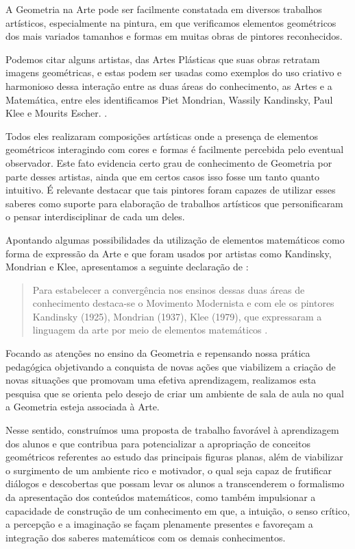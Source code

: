 \begin{refsection}
    A Geometria na Arte pode ser facilmente constatada em diversos trabalhos artísticos, especialmente na pintura, em que verificamos elementos geométricos dos mais variados tamanhos e formas em muitas obras de pintores reconhecidos.  

    Podemos citar alguns artistas, das Artes Plásticas que suas obras retratam imagens geométricas, e estas podem ser usadas como exemplos do uso criativo e harmonioso dessa interação entre as duas áreas do conhecimento, as Artes e a Matemática, entre eles identificamos Piet Mondrian, Wassily Kandinsky, Paul Klee e Mourits Escher. \cite{WIKIARTEnciclopédia}.

    Todos eles realizaram composições artísticas onde a presença de elementos geométricos interagindo com cores e formas é facilmente percebida pelo eventual observador. Este fato evidencia certo grau de conhecimento de Geometria por parte desses artistas, ainda que em certos casos isso fosse um tanto quanto intuitivo. É relevante destacar que tais pintores foram capazes de utilizar esses saberes como suporte para elaboração de trabalhos artísticos que personificaram o pensar interdisciplinar de cada um deles.  

    Apontando algumas possibilidades da utilização de elementos matemáticos como forma de expressão da Arte e que foram usados por artistas como Kandinsky, Mondrian e Klee, apresentamos a seguinte declaração de \textcite{ARAÚJO2008Ponto}: 

    \begin{quotation}
        Para estabelecer a convergência nos ensinos dessas duas áreas de conhecimento destaca-se o Movimento Modernista e com ele os pintores Kandinsky (1925), Mondrian (1937), Klee (1979), que expressaram a linguagem da arte por meio de elementos matemáticos \cite[p.~61]{ARAÚJO2008Ponto}. 
    \end{quotation}

    Focando as atenções no ensino da Geometria e repensando nossa prática pedagógica objetivando a conquista de novas ações que viabilizem a criação de novas situações que promovam uma efetiva aprendizagem, realizamos esta pesquisa que se orienta pelo desejo de criar um ambiente de sala de aula no qual a Geometria esteja associada à Arte.  

    Nesse sentido, construímos uma proposta de trabalho favorável à aprendizagem dos alunos e que contribua para potencializar a apropriação de conceitos geométricos referentes ao estudo das principais figuras planas, além de viabilizar o surgimento de um ambiente rico e motivador, o qual seja capaz de frutificar diálogos e descobertas que possam levar os alunos a transcenderem o formalismo da apresentação dos conteúdos matemáticos, como também impulsionar a capacidade de construção de um conhecimento em que, a intuição, o senso crítico, a percepção e a imaginação se façam plenamente presentes e favoreçam a integração dos saberes matemáticos com os demais conhecimentos.  


\end{refsection}
